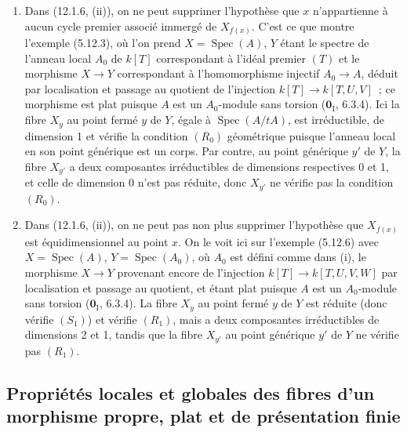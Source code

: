 \begin{remarks}[12.1.8]
\label{IV.12.1.8-fr}
\begin{enumerate}[label=(\roman*)]
  \item Dans (12.1.6, (ii)), on ne peut supprimer l'hypothèse que $x$
  n'appartienne à aucun cycle premier associé immergé de $X_{f(x)}$. C'est ce
  que montre l'exemple (5.12.3), où l'on prend $X=\operatorname{Spec}(A)$, $Y$
  étant le spectre de l'anneau local $A_0$ de $k[T]$ correspondant à l'idéal
  premier $(T)$ et le morphisme $X\to Y$ correspondant à l'homomorphisme
  injectif $A_0\to A$, déduit par localisation et passage au quotient de
  l'injection $k[T]\to k[T,U,V]$~; ce morphisme est plat puisque $A$ est un
  $A_0$-module sans torsion ($\mathbf 0_{\mathrm I}$, 6.3.4). Ici la fibre
  $X_y$ au point fermé $y$ de $Y$, égale à $\operatorname{Spec}(A/tA)$, est
  irréductible, de dimension 1 et vérifie la condition $(R_0)$ géométrique
  puisque l'anneau local en son point générique est un corps. Par contre, au
  point générique $y'$ de $Y$, la fibre $X_{y'}$ a deux composantes
  irréductibles de dimensions respectives 0 et 1, et celle de dimension 0
  n'est pas réduite, donc $X_{y'}$ ne vérifie pas la condition $(R_0)$.
  \item Dans (12.1.6, (ii)), on ne peut pas non plus supprimer l'hypothèse que
  $X_{f(x)}$ est équidimensionnel au point $x$. On le voit ici sur l'exemple
  (5.12.6) avec $X=\operatorname{Spec}(A)$, $Y=\operatorname{Spec}(A_0)$, où
  $A_0$ est défini comme dans (i), le morphisme $X\to Y$ provenant encore de
  l'injection $k[T]\to k[T,U,V,W]$ par localisation et passage au quotient, et
  étant plat puisque $A$ est un $A_0$-module sans torsion
  ($\mathbf 0_{\mathrm I}$, 6.3.4). La fibre $X_y$ au point fermé $y$ de $Y$
  est réduite (donc vérifie $(S_1)$) et vérifie $(R_1)$, mais a deux composantes
  irréductibles de dimensions 2 et 1, tandis que la fibre $X_{y'}$ au point
  générique $y'$ de $Y$ ne vérifie pas $(R_1)$.
\end{enumerate}
\end{remarks}
\subsection{Propriétés locales et globales des fibres d'un morphisme propre,
plat et de présentation finie}
\label{subsection:IV.12.2-fr}

